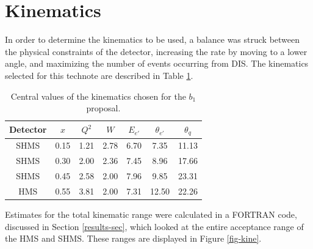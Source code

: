 \documentclass[11pt]{article}
\begin{document}
\section{Kinematics}
\label{kine-sec}
In order to determine the kinematics to be used, a balance was struck between the physical constraints of the detector, increasing the rate by moving to a lower angle, and maximizing the number of events occurring from DIS. The kinematics selected for this technote are described in Table \ref{tab:kine}.


\begin{table}[htdp]
\caption{Central values of the kinematics chosen for the $b_1$ proposal.}
\begin{center}
\begin{tabular}{|c|c|c|c|c|c|c|}
\hline
   Detector & $x$  &   $Q^2$ &    $W$  &  $E_{e'}$  &  $\theta_{e'}$  &  $\theta_q$ \\
\hline   
SHMS	 & 0.15 &	1.21 & 2.78 & 6.70 &  7.35 & 11.13 \\
SHMS	 & 0.30 &	2.00 & 2.36 & 7.45 &  8.96 & 17.66 \\
SHMS	 & 0.45 &	2.58 & 2.00 & 7.96 &  9.85 & 23.31 \\
HMS	 & 0.55 &	3.81 & 2.00 & 7.31 & 12.50 & 22.26 \\
\hline  
\end{tabular}
\end{center}
\label{tab:kine}
\end{table}%

Estimates for the total kinematic range were calculated in a FORTRAN code, discussed in Section \ref{results-sec}, which looked at the entire acceptance range of the HMS and SHMS. These ranges are displayed in Figure \ref{fig-kine}.
\end{document}
